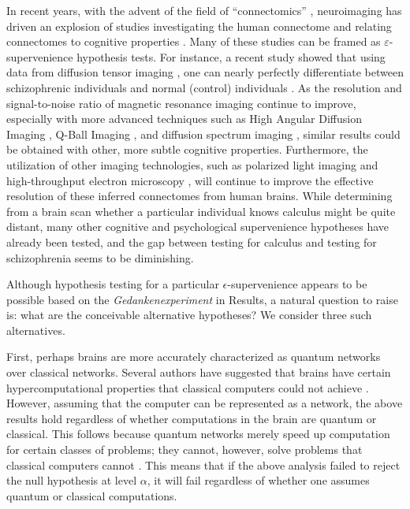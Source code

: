 \documentclass{article}
\newcommand{\eps}{\varepsilon}
\begin{document}
In recent years, with the advent of the field of ``connectomics'' \cite{SpornsKotter05,Hagmann05}, neuroimaging has driven an explosion of studies investigating the human connectome and relating connectomes to cognitive properties \cite{Sporns10}. %
Many of these studies can be framed as $\eps$-supervenience hypothesis tests.  For instance, a recent study showed that using data from diffusion tensor imaging \cite{Basser94}, one can nearly perfectly differentiate between schizophrenic individuals and normal (control) individuals \cite{ArdekaniSzeszko10}.  As the resolution and signal-to-noise ratio of magnetic resonance imaging continue to improve, especially with more advanced techniques such as High Angular Diffusion Imaging \cite{TuchWedeen02}, Q-Ball Imaging \cite{Tuch04}, and diffusion spectrum imaging \cite{WedeenWeisskoff05}, similar results could be obtained with other, more subtle cognitive properties.  Furthermore, the utilization of other imaging technologies, such as polarized light imaging \cite{PalmAmunts10} and high-throughput electron microscopy \cite{DenkHorstmann04,HayworthLichtman06}, will continue to improve the effective resolution of these inferred connectomes from human brains. While determining from a brain scan whether a particular individual knows calculus might be quite distant, many other cognitive and psychological supervenience hypotheses have already been tested, and the gap between testing for calculus and testing for schizophrenia seems to be diminishing.




Although hypothesis testing for a particular $\epsilon$-supervenience appears to be possible based on the \emph{Gedankenexperiment} in Results, a natural question to raise is: what are the conceivable alternative hypotheses?  We consider three such alternatives.  

First, perhaps brains are more accurately characterized as quantum networks over classical networks.  Several authors have suggested that brains have certain hypercomputational properties that classical computers could not achieve \cite{Penrose99,Satinover02}. However, assuming that the computer can be represented as a network, the above results hold regardless of whether computations in the brain are quantum or classical.  This follows because quantum networks merely speed up computation for certain classes of problems; they cannot, however, solve problems that classical computers cannot \cite{NielsenChuang00}.  This means that if the above analysis failed to reject the null hypothesis at level $\alpha$, it will fail regardless of whether one assumes quantum or classical computations.
\end{document}
